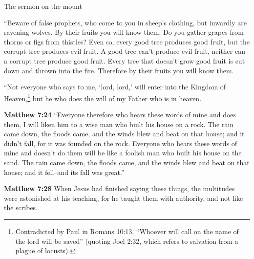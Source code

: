 \documentclass[10pt,twoside]{article} %
\newcommand{\quotesize}{\normalsize{}}
\newenvironment{quotetext}{\begingroup\quotesize}{\endgroup}
\newcommand{\intex}[1]{\index[texts]{#1}}
\newcommand{\bible}[2]{\begin{quotetext}\textbf{#1}\intex{#1} #2\end{quotetext}}
\newcommand{\matthew}[2]{\bible{Matthew #1}{#2}}
\begin{document}
\begin{section}{The sermon on the mount}
{   ``Beware of false prophets, who come to you in sheep's clothing, but inwardly are ravening wolves.    By their fruits you will know them. Do you gather grapes from thorns or figs from thistles?    Even so, every good tree produces good fruit, but the corrupt tree produces evil fruit.    A good tree can't produce evil fruit, neither can a corrupt tree produce good fruit.    Every tree that doesn't grow good fruit is cut down and thrown into the fire.    Therefore by their fruits you will know them.

   ``Not everyone who says to me, `lord, lord,' will enter into the Kingdom of 
Heaven,\footnote{Contradicted by Paul in Romans 10:13, ``Whoever will call on the name of the lord will be saved''
(quoting Joel 2:32, which refers to salvation from a plague of locusts).\label{paul-contradicts-gospels}} but he who does the will of my Father who is in heaven.
}

\matthew{7:24}{
  ``Everyone therefore who hears these words of mine and does them, I will liken him to a wise man who built his house on a rock.    The rain came down, the floods came, and the winds blew and beat on that house; and it didn't fall, for it was founded on the rock.    Everyone who hears these words of mine and doesn't do them will be like a foolish man who built his house on the sand.    The rain came down, the floods came, and the winds blew and beat on that house; and it fell--and its fall was great.''
}

\matthew{7:28}{
  When Jesus had finished saying these things, the multitudes were astonished at his teaching,   for he taught them with authority, and not like the scribes.
}

\end{section}
\end{document}
